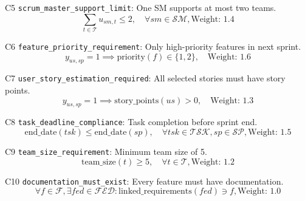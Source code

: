 \documentclass[11pt]{article}
\begin{document}
    \item[C5] \texttt{scrum\_master\_support\_limit}: One SM supports at most two teams.
    \[
    \sum_{t \in \mathcal{T}} u_{sm,t} \leq 2, \quad \forall sm \in \mathcal{SM}, \text{Weight: } 1.4
    \]
    
    \item[C6] \texttt{feature\_priority\_requirement}: Only high-priority features in next sprint.
    \[
    y_{us,sp} = 1 \implies \text{priority}(f) \in \{1,2\}, \quad \text{Weight: } 1.6
    \]
    
    \item[C7] \texttt{user\_story\_estimation\_required}: All selected stories must have story points.
    \[
    y_{us,sp} = 1 \implies \text{story\_points}(us) > 0, \quad \text{Weight: } 1.3
    \]
    
    \item[C8] \texttt{task\_deadline\_compliance}: Task completion before sprint end.
    \[
    \text{end\_date}(tsk) \leq \text{end\_date}(sp), \quad \forall tsk \in \mathcal{TSK}, sp \in \mathcal{SP}, \text{Weight: } 1.5
    \]
    
    \item[C9] \texttt{team\_size\_requirement}: Minimum team size of 5.
    \[
    \text{team\_size}(t) \geq 5, \quad \forall t \in \mathcal{T}, \text{Weight: } 1.2
    \]
    
    \item[C10] \texttt{documentation\_must\_exist}: Every feature must have documentation.
    \[
    \forall f \in \mathcal{F}, \exists fed \in \mathcal{FED} : \text{linked\_requirements}(fed) \ni f, \text{Weight: } 1.0
    \]
\end{document}
